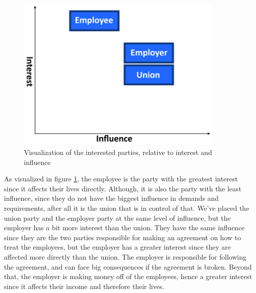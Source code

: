 \begin{figure}[ht!]
    \centering
    \includegraphics[width=100mm]{media/Interested Parties.png}
    \caption{Visualization of the interested parties, relative to interest and influence}
    \label{fig:Interested parties graph}
\end{figure}

As visualized in figure \ref{fig:Interested parties graph}, the employee is the party with the greatest interest since it affects their lives directly. Although, it is also the party with the least influence, since they do not have the biggest influence in demands and requirements, after all it is the union that is in control of that. We've placed the union party and the employer party at the same level of influence, but the employer has a bit more interest than the union. They have the same influence since they are the two parties responsible for making an agreement on how to treat the employees, but the employer has a greater interest since they are affected more directly than the union. The employer is responsible for following the agreement, and can face big consequences if the agreement is broken. Beyond that, the employer is making money off of the employees, hence a greater interest since it affects their income and therefore their lives.
